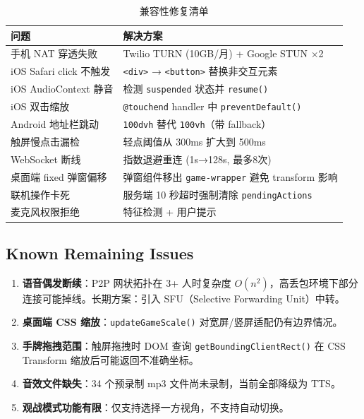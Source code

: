 \documentclass[11pt,a4paper]{article}
\begin{document}
\begin{table}[H]
\centering
\caption{兼容性修复清单}
\label{tab:compat}
\small
\begin{tabular}{@{}ll@{}}
\toprule
\textbf{问题} & \textbf{解决方案} \\
\midrule
手机 NAT 穿透失败 & Twilio TURN (10GB/月) + Google STUN ×2 \\
iOS Safari click 不触发 & \texttt{<div>} → \texttt{<button>} 替换非交互元素 \\
iOS AudioContext 静音 & 检测 \texttt{suspended} 状态并 \texttt{resume()} \\
\multicolumn{1}{l}{iOS 双击缩放} & \texttt{@touchend} handler 中 \texttt{preventDefault()} \\
Android 地址栏跳动 & \texttt{100dvh} 替代 \texttt{100vh}（带 fallback） \\
触屏慢点击漏检 & 轻点阈值从 300ms 扩大到 500ms \\
WebSocket 断线 & 指数退避重连 (1s→128s, 最多8次) \\
桌面端 fixed 弹窗偏移 & 弹窗组件移出 \texttt{game-wrapper} 避免 transform 影响 \\
联机操作卡死 & 服务端 10 秒超时强制清除 \texttt{pendingActions} \\
麦克风权限拒绝 & 特征检测 + 用户提示 \\
\bottomrule
\end{tabular}
\end{table}

\subsection{Known Remaining Issues}

\begin{enumerate}[nosep]
  \item \textbf{语音偶发断续}：P2P 网状拓扑在 3+ 人时复杂度 $O(n^2)$，高丢包环境下部分连接可能掉线。长期方案：引入 SFU（Selective Forwarding Unit）中转。
  \item \textbf{桌面端 CSS 缩放}：\texttt{updateGameScale()} 对宽屏/竖屏适配仍有边界情况。
  \item \textbf{手牌拖拽范围}：触屏拖拽时 DOM 查询 \texttt{getBoundingClientRect()} 在 CSS Transform 缩放后可能返回不准确坐标。
  \item \textbf{音效文件缺失}：34 个预录制 mp3 文件尚未录制，当前全部降级为 TTS。
  \item \textbf{观战模式功能有限}：仅支持选择一方视角，不支持自动切换。
\end{enumerate}
\end{document}
